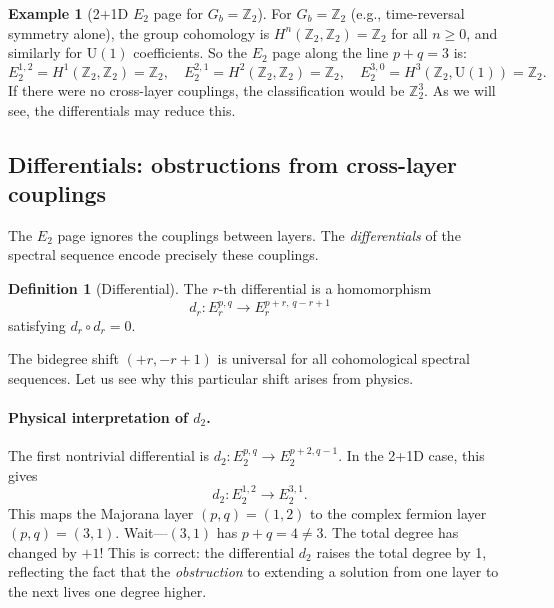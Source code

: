 \documentclass{SciPost}
\theoremstyle{definition}
\newtheorem{definition}[theorem]{Definition}
\newtheorem{example}[theorem]{Example}
\newcommand{\Zt}{\mathbb{Z}_2}
\newcommand{\U}{\mathrm{U}}
\newcommand{\Gb}{G_b}
\begin{document}
\begin{example}[2+1D $E_2$ page for $\Gb = \Zt$]
For $\Gb = \Zt$ (e.g., time-reversal symmetry alone), the group cohomology is $H^n(\Zt, \Zt) = \Zt$ for all $n \geq 0$, and similarly for $\U(1)$ coefficients.
So the $E_2$ page along the line $p + q = 3$ is:
\begin{equation}
E_2^{1,2} = H^1(\Zt, \Zt) = \Zt, \quad
E_2^{2,1} = H^2(\Zt, \Zt) = \Zt, \quad
E_2^{3,0} = H^3(\Zt, \U(1)) = \Zt.
\end{equation}
If there were no cross-layer couplings, the classification would be $\Zt^3$.
As we will see, the differentials may reduce this.
\end{example}

\subsection{Differentials: obstructions from cross-layer couplings}
\label{subsec:differentials}

The $E_2$ page ignores the couplings between layers.
The \emph{differentials} of the spectral sequence encode precisely these couplings.

\begin{definition}[Differential]
The $r$-th differential is a homomorphism
\begin{equation}
\label{eq:dr-bidegree}
d_r: E_r^{p,q} \longrightarrow E_r^{p+r,\, q-r+1}
\end{equation}
satisfying $d_r \circ d_r = 0$.
\end{definition}

The bidegree shift $(+r, -r+1)$ is universal for all cohomological spectral sequences.
Let us see why this particular shift arises from physics.

\paragraph{Physical interpretation of $d_2$.}
The first nontrivial differential is $d_2: E_2^{p,q} \to E_2^{p+2, q-1}$.
In the 2+1D case, this gives
\begin{equation}
d_2: E_2^{1,2} \longrightarrow E_2^{3,1}.
\end{equation}
This maps the Majorana layer $(p,q) = (1,2)$ to the complex fermion layer $(p,q) = (3,1)$.
Wait---$(3,1)$ has $p + q = 4 \neq 3$.
The total degree has changed by $+1$!
This is correct: the differential $d_2$ raises the total degree by 1, reflecting the fact that the \emph{obstruction} to extending a solution from one layer to the next lives one degree higher.
\end{document}
